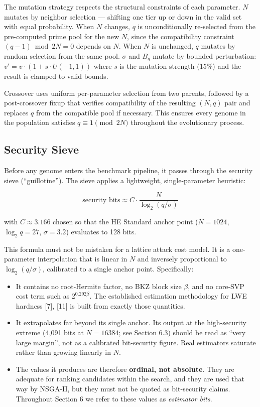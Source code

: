 The mutation strategy respects the structural constraints of each parameter. \(N\) mutates by neighbor selection --- shifting one tier up or down in the valid set with equal probability. When \(N\) changes, \(q\) is unconditionally re-selected from the pre-computed prime pool for the new \(N\), since the compatibility constraint \((q - 1) \bmod 2N = 0\) depends on \(N\). When \(N\) is unchanged, \(q\) mutates by random selection from the same pool. \(\sigma\) and \(B_g\) mutate by bounded perturbation: \(v' = v \cdot (1 + s \cdot U(-1, 1))\) where \(s\) is the mutation strength (15\%) and the result is clamped to valid bounds.

Crossover uses uniform per-parameter selection from two parents, followed by a post-crossover fixup that verifies compatibility of the resulting \((N, q)\) pair and replaces \(q\) from the compatible pool if necessary. This ensures every genome in the population satisfies \(q \equiv 1 \pmod{2N}\) throughout the evolutionary process.

\subsection{Security Sieve}\label{security-sieve}

Before any genome enters the benchmark pipeline, it passes through the security sieve (``guillotine''). The sieve applies a lightweight, single-parameter heuristic:

\[\text{security\_bits} \approx C \cdot \frac{N}{\log_2(q / \sigma)}\]

with \(C \approx 3.166\) chosen so that the HE Standard anchor point (\(N = 1024\), \(\log_2 q = 27\), \(\sigma = 3.2\)) evaluates to 128 bits.

This formula must not be mistaken for a lattice attack cost model. It is a one-parameter interpolation that is linear in \(N\) and inversely proportional to \(\log_2(q/\sigma)\), calibrated to a single anchor point. Specifically:

\begin{itemize}
\tightlist
\item
  It contains no root-Hermite factor, no BKZ block size \(\beta\), and no core-SVP cost term such as \(2^{0.292\beta}\). The established estimation methodology for LWE hardness [7], [11] is built from exactly those quantities.
\item
  It extrapolates far beyond its single anchor. Its output at the high-security extreme (4,091 bits at \(N = 16384\); see Section 6.3) should be read as ``very large margin'', not as a calibrated bit-security figure. Real estimators saturate rather than growing linearly in \(N\).
\item
  The values it produces are therefore \textbf{ordinal, not absolute}. They are adequate for ranking candidates within the search, and they are used that way by NSGA-II, but they must not be quoted as bit-security claims. Throughout Section 6 we refer to these values as \emph{estimator bits}.
\end{itemize}

